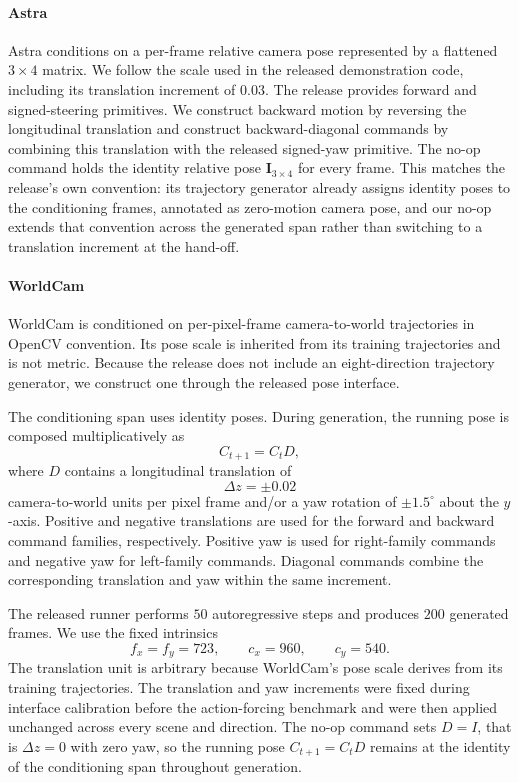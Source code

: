 \documentclass[letterpaper]{article} %
\begin{document}
\paragraph{Astra}
Astra conditions on a per-frame relative camera pose represented by a
flattened $3\times4$ matrix. We follow the scale used in the released
demonstration code, including its translation increment of $0.03$. The release
provides forward and signed-steering primitives. We construct backward motion
by reversing the longitudinal translation and construct backward-diagonal
commands by combining this translation with the released signed-yaw
primitive. The no-op command holds the identity relative pose $\mathbf{I}_{3\times4}$ for
every frame. This matches the release's own convention: its trajectory
generator already assigns identity poses to the conditioning frames, annotated
as zero-motion camera pose, and our no-op extends that convention across the
generated span rather than switching to a translation increment at the
hand-off.

\paragraph{WorldCam}
WorldCam is conditioned on per-pixel-frame camera-to-world trajectories in
OpenCV convention. Its pose scale is inherited from its training trajectories
and is not metric. Because the release does not include an eight-direction
trajectory generator, we construct one through the released pose interface.

The conditioning span uses identity poses. During generation, the running pose
is composed multiplicatively as
\[
C_{t+1}=C_tD,
\]
where $D$ contains a longitudinal translation of
\[
\Delta z=\pm0.02
\]
camera-to-world units per pixel frame and/or a yaw rotation of
$\pm1.5^\circ$ about the $y$-axis. Positive and negative translations are used
for the forward and backward command families, respectively. Positive yaw is
used for right-family commands and negative yaw for left-family commands.
Diagonal commands combine the corresponding translation and yaw within the
same increment.

The released runner performs $50$ autoregressive steps and produces $200$
generated frames. We use the fixed intrinsics
\[
f_x=f_y=723,\qquad c_x=960,\qquad c_y=540.
\]
The translation unit is arbitrary because WorldCam's pose scale derives from
its training trajectories. The translation and yaw increments were fixed
during interface calibration before the action-forcing benchmark and were
then applied unchanged across every scene and direction. The no-op command sets $D=I$, that is $\Delta z=0$ with zero yaw, so the
running pose $C_{t+1}=C_tD$ remains at the identity of the conditioning span
throughout generation.
\end{document}
